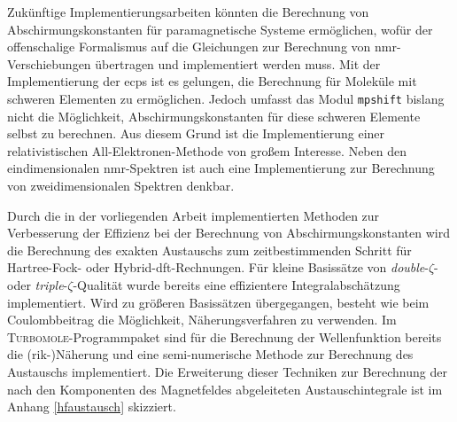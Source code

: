 Zukünftige Implementierungsarbeiten könnten die Berechnung von Abschirmungskonstanten für paramagnetische Systeme ermöglichen, wofür der offenschalige Formalismus auf die Gleichungen zur Berechnung von \ac{nmr}-Verschiebungen übertragen und implementiert werden muss. Mit der Implementierung der \acp{ecp} ist es gelungen, die Berechnung für Moleküle mit schweren Elementen zu ermöglichen. Jedoch umfasst das Modul \texttt{mpshift} bislang nicht die Möglichkeit, Abschirmungskonstanten für diese schweren Elemente selbst zu berechnen. Aus diesem Grund ist die Implementierung einer relativistischen All-Elektronen-Methode von großem Interesse. Neben den eindimensionalen \ac{nmr}-Spektren ist auch eine Implementierung zur Berechnung von zweidimensionalen Spektren denkbar.  

Durch die in der vorliegenden Arbeit implementierten Methoden zur Verbesserung der Effizienz bei der Berechnung von Abschirmungskonstanten wird die Berechnung des exakten Austauschs zum zeitbestimmenden Schritt für Hartree-Fock- oder Hybrid-\ac{dft}-Rechnungen. Für kleine Basissätze von \textit{double}-$\zeta$- oder \textit{triple}-$\zeta$-Qualität wurde bereits eine effizientere Integralabschätzung implementiert. Wird zu größeren Basissätzen übergegangen, besteht wie beim Coulombbeitrag die Möglichkeit, Näherungsverfahren zu verwenden. Im \textsc{Turbomole}-Programmpaket sind für die Berechnung der Wellenfunktion   bereits die \mbox{(\acs{rik}-)}Näherung\supercite{weigend2002fully} und eine semi-numerische Methode\supercite{plessow2012seminumerical} zur Berechnung des Austauschs implementiert. Die Erweiterung dieser Techniken zur Berechnung der nach den Komponenten des Magnetfeldes abgeleiteten Austauschintegrale ist im Anhang \ref{hfaustausch} skizziert. 
\vfill
\newpage
\thispagestyle{empty}
\cleardoublepage


